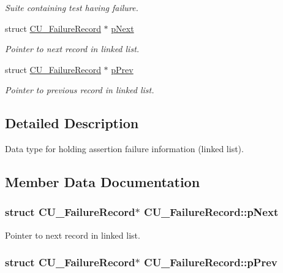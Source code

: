 \begin{DoxyCompactItemize}
\begin{DoxyCompactList}\small\item\em Suite containing test having failure. \end{DoxyCompactList}\item 
struct \hyperlink{struct_c_u___failure_record}{C\+U\+\_\+\+Failure\+Record} $\ast$ \hyperlink{struct_c_u___failure_record_aef89a7d18b1e082202368decabe8c1f8}{p\+Next}
\begin{DoxyCompactList}\small\item\em Pointer to next record in linked list. \end{DoxyCompactList}\item 
struct \hyperlink{struct_c_u___failure_record}{C\+U\+\_\+\+Failure\+Record} $\ast$ \hyperlink{struct_c_u___failure_record_a617e40c3052b6b7cf3a873296ed27e56}{p\+Prev}
\begin{DoxyCompactList}\small\item\em Pointer to previous record in linked list. \end{DoxyCompactList}\end{DoxyCompactItemize}


\subsection{Detailed Description}
Data type for holding assertion failure information (linked list). 



\subsection{Member Data Documentation}
\hypertarget{struct_c_u___failure_record_aef89a7d18b1e082202368decabe8c1f8}{
\subsubsection[{p\+Next}]{\setlength{\rightskip}{0pt plus 5cm}struct {\bf C\+U\+\_\+\+Failure\+Record}$\ast$ C\+U\+\_\+\+Failure\+Record\+::p\+Next}}\label{struct_c_u___failure_record_aef89a7d18b1e082202368decabe8c1f8}


Pointer to next record in linked list. 

\hypertarget{struct_c_u___failure_record_a617e40c3052b6b7cf3a873296ed27e56}{
\subsubsection[{p\+Prev}]{\setlength{\rightskip}{0pt plus 5cm}struct {\bf C\+U\+\_\+\+Failure\+Record}$\ast$ C\+U\+\_\+\+Failure\+Record\+::p\+Prev}}\label{struct_c_u___failure_record_a617e40c3052b6b7cf3a873296ed27e56}


